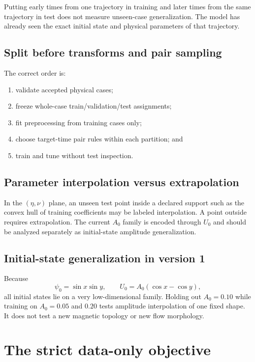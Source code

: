 \documentclass[11pt]{article}
\begin{document}
\begin{warningbox}
Putting early times from one trajectory in training and later times from the same trajectory in test does not measure unseen-case generalization. The model has already seen the exact initial state and physical parameters of that trajectory.
\end{warningbox}

\subsection{Split before transforms and pair sampling}
The correct order is:
\begin{enumerate}
  \item validate accepted physical cases;
  \item freeze whole-case train/validation/test assignments;
  \item fit preprocessing from training cases only;
  \item choose target-time pair rules within each partition; and
  \item train and tune without test inspection.
\end{enumerate}

\subsection{Parameter interpolation versus extrapolation}
In the $(\eta,\nu)$ plane, an unseen test point inside a declared support such as the convex hull of training coefficients may be labeled interpolation. A point outside requires extrapolation. The current $A_0$ family is encoded through $U_0$ and should be analyzed separately as initial-state amplitude generalization.

\subsection{Initial-state generalization in version 1}
Because
\[
\psi_0=\sin x\sin y,\qquad U_0=A_0(\cos x-\cos y),
\]
all initial states lie on a very low-dimensional family. Holding out $A_0=0.10$ while training on $A_0=0.05$ and $0.20$ tests amplitude interpolation of one fixed shape. It does not test a new magnetic topology or new flow morphology.

\section{The strict data-only objective}
\label{sec:loss}
\end{document}
